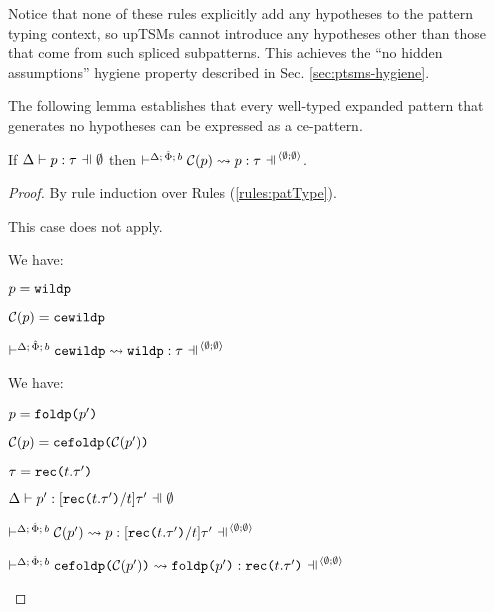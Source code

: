 {{{{Notice that none of these rules explicitly add any hypotheses to the pattern typing context, so upTSMs cannot introduce any hypotheses other than those that come from such spliced subpatterns. This achieves the ``no hidden assumptions'' hygiene property described in Sec. \ref{sec:ptsms-hygiene}.

The following lemma establishes that every well-typed expanded pattern that generates no hypotheses can be expressed as a ce-pattern.
\begin{lemma}\label{lemma:ce-pattern-expressibility-U} If $\patType{\emptyset}{p}{\tau}$ then $\cvalidP{\uGG{\emptyset}{\emptyset}}{\pscene{\Delta}{\uPhi}{b}}{\Cof{p}}{p}{\tau}$.\end{lemma}
\begin{proof} By rule induction over Rules (\ref{rules:patType}).
\begin{byCases}
\item[\text{(\ref{rule:patType-var})}] This case does not apply.
\item[\text{(\ref{rule:patType-wild})}] We have:
  \begin{pfsteps*}
    \item $p=\texttt{wildp}$ 
    \item $\mathcal{C}(p)=\texttt{cewildp}$ 
    \item $\cvalidP{\uGG{\emptyset}{\emptyset}}{\pscene{\Delta}{\uPhi}{b}}{\acewildp}{\aewildp}{\tau}$ 
  \end{pfsteps*}
  \resetpfcounter
\item[\text{(\ref{rule:patType-fold})}] We have:
  \begin{pfsteps*}
    \item $p=\texttt{foldp}\texttt{(}p'\texttt{)}$ 
    \item $\mathcal{C}(p)=\texttt{cefoldp}\texttt{(}\mathcal{C}(p')\texttt{)}$ 
    \item $\tau=\texttt{rec}\texttt{(}t.\tau'\texttt{)}$ 
    \item $\patType{\emptyset}{p'}{[\arec{t}{\tau'}/t]\tau'}$  
    \item $\cvalidP{\uGG{\emptyset}{\emptyset}}{\pscene{\Delta}{\uPhi}{b}}{\Cof{p'}}{p}{[\arec{t}{\tau'}/t]\tau'}$  
    \item $\cvalidP{\uGG{\emptyset}{\emptyset}}{\pscene{\Delta}{\uPhi}{b}}{\acefoldp{\Cof{p'}}}{\aefoldp{p'}}{\arec{t}{\tau'}}$ 

\end{pfsteps*}
\end{byCases}
\end{proof}}}}}
